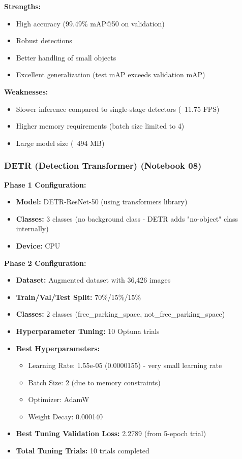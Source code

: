\documentclass[12pt,a4paper]{article}
\begin{document}
\textbf{Strengths:}
\begin{itemize}
    \item High accuracy (99.49\% mAP@50 on validation)
    \item Robust detections
    \item Better handling of small objects
    \item Excellent generalization (test mAP exceeds validation mAP)
\end{itemize}

\textbf{Weaknesses:}
\begin{itemize}
    \item Slower inference compared to single-stage detectors (~11.75 FPS)
    \item Higher memory requirements (batch size limited to 4)
    \item Large model size (~494 MB)
\end{itemize}

\subsubsection{DETR (Detection Transformer) (Notebook 08)}

\textbf{Phase 1 Configuration:}
\begin{itemize}
    \item \textbf{Model:} DETR-ResNet-50 (using transformers library)
    \item \textbf{Classes:} 3 classes (no background class - DETR adds "no-object" class internally)
    \item \textbf{Device:} CPU
\end{itemize}

\textbf{Phase 2 Configuration:}
\begin{itemize}
    \item \textbf{Dataset:} Augmented dataset with 36,426 images
    \item \textbf{Train/Val/Test Split:} 70\%/15\%/15\%
    \item \textbf{Classes:} 2 classes (free\_parking\_space, not\_free\_parking\_space)
    \item \textbf{Hyperparameter Tuning:} 10 Optuna trials
    \item \textbf{Best Hyperparameters:}
    \begin{itemize}
        \item Learning Rate: 1.55e-05 (0.0000155) - very small learning rate
        \item Batch Size: 2 (due to memory constraints)
        \item Optimizer: AdamW
        \item Weight Decay: 0.000140
    \end{itemize}
    \item \textbf{Best Tuning Validation Loss:} 2.2789 (from 5-epoch trial)
    \item \textbf{Total Tuning Trials:} 10 trials completed
\end{itemize}
\end{document}
